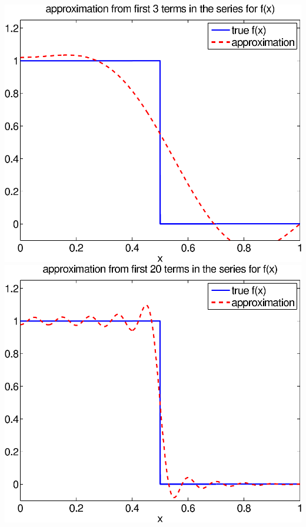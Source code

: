 {\begin{solution}
\begin{enumerate}
\begin{center}
   \includegraphics[scale=0.4]{bvps3_3b}\quad
   \includegraphics[scale=0.4]{bvps3_20b}
\end{center}


\end{enumerate}
\end{solution}}
